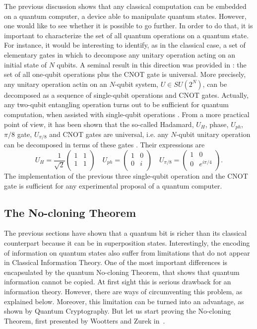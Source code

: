\documentclass[a4paper]{article}
\begin{document}
The previous discussion shows that any classical computation can
be embedded on a quantum computer, a device able to manipulate
quantum states. However, one would like to see whether it is
possible to go further. In order to do that, it is important to
characterize the set of all quantum operations on a quantum state.
For instance, it would be interesting to identify, as in the
classical case, a set of elementary gates in which to decompose
any unitary operation acting on an initial state of $N$ qubits. A seminal
result in this direction was provided in \cite{universal}: the set
of all one-qubit operations plus the CNOT gate is
universal. More precisely, any unitary operation actin on an $N$-qubit
system, $U\in SU(2^N)$, can be decomposed as a sequence
of single-qubit operations and CNOT gates. Actually, any two-qubit
entangling operation turns out to be sufficient for quantum
computation, when assisted with single-qubit operations
\cite{twoqubit}. From a more practical point of view, it has been
shown that the so-called Hadamard, $U_H$, phase, $U_{ph}$, $\pi/8$
gate, $U_{\pi/8}$ and CNOT gates are universal, i.e. any $N$-qubit
unitary operation can be decomposed in terms of these
gates \cite{BMPRV}. Their expressions are
\begin{equation}
  U_H = \frac{1}{\sqrt 2}\begin{pmatrix}1 & 1 \\
  1 & 1\\\end{pmatrix}\quad
  U_{ph} = \begin{pmatrix}1 & 0 \\
  0 & i\\\end{pmatrix}\quad
  U_{\pi/8} = \begin{pmatrix}1 & 0 \\
  0 & e^{i\pi/4}\\\end{pmatrix} .
\end{equation}
The implementation of the previous three single-qubit operation
and the CNOT gate is sufficient for any experimental proposal of a
quantum computer. 

\subsection{The No-cloning Theorem}

The previous sections have shown that a quantum bit is richer than its classical counterpart
because it can be in superposition states.
Interestingly, the encoding of information on quantum states also
suffer from limitations that do not appear in Classical
Information Theory. One of the most important differences is encapsulated by the quantum
No-cloning Theorem, that shows that quantum information cannot be
copied. At first sight this is serious drawback for an information
theory. However, there are ways of circumventing this problem, as explained 
below. Moreover, this limitation can be turned into an
advantage, as shown by Quantum Cryptography. But let us
start proving the No-cloning Theorem, first presented by Wootters
and Zurek in~\cite{noclon}.
\end{document}
